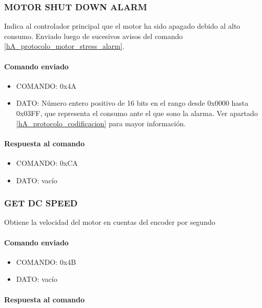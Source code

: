 \subsubsection{MOTOR SHUT DOWN ALARM}
\label{hA_protocolo_motor_shutdown_alarm}

Indica al controlador principal que el motor ha sido apagado debido al alto consumo.
Enviado luego de sucesivos avisos del comando \ref{hA_protocolo_motor_stress_alarm}.

\paragraph*{Comando enviado}

\begin{itemize}
	\item{COMANDO:} 0x4A
	\item{DATO:} N\'umero entero positivo de 16 bits en el rango desde 0x0000 hasta 0x03FF, que representa el consumo ante el que sono la alarma.
		Ver apartado \ref{hA_protocolo_codificacion} para mayor informaci\'on.
\end{itemize}

\paragraph*{Respuesta al comando}

\begin{itemize}
	\item{COMANDO:} 0xCA
	\item{DATO:} vac\'io
\end{itemize}

\subsubsection{GET DC SPEED}
\label{hA_protocolo_set_dc_speed}

Obtiene la velocidad del motor en cuentas del encoder por segundo

\paragraph*{Comando enviado}
\begin{itemize}
	\item{COMANDO:} 0x4B
	\item{DATO:} vac\'io
\end{itemize}

\paragraph*{Respuesta al comando}

